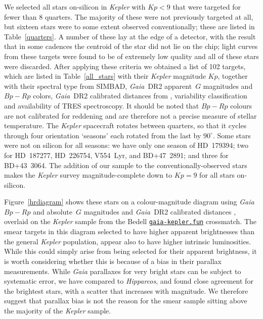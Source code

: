 \documentclass[modern]{aastex62}
\newcommand{\kepler}{\textit{Kepler}\xspace}
\newcommand{\hipparcos}{\textit{Hipparcos}\xspace}
\newcommand{\gaia}{\textit{Gaia}\xspace}
\begin{document}
We selected all stars on-silicon in \kepler with $Kp<9$ that were targeted for fewer than $8$ quarters. The majority of these were not previously targeted at all, but sixteen stars were to some extent observed conventionally; these are listed in Table~\ref{quarters}. A number of these lay at the edge of a detector, with the result that in some cadences the centroid of the star did not lie on the chip; light curves from these targets were found to be of extremely low quality and all of these stars were discarded. After applying these criteria we obtained a list of 102 targets, which are listed in Table~\ref{all_stars} with their \kepler magnitude $Kp$, together with their spectral type from SIMBAD, \gaia~DR2 apparent~$G$ magnitudes and $Bp-Rp$ colors, \gaia~DR2 calibrated distances from \citet{gaiadists}, variability classification and availability of TRES spectroscopy. It should be noted that $Bp-Rp$ colours are not calibrated for reddening and are therefore not a precise measure of stellar temperature. The \kepler spacecraft rotates between quarters, so that it cycles through four orientation `seasons' each rotated from the last by $90^{\circ}$. Some stars were not on silicon for all seasons: we have only one season of HD~179394; two for HD~187277, HD~226754, V554~Lyr, and BD+47~2891; and three for BD+43~3064. The addition of our sample to the conventionally-observed stars makes the \kepler survey magnitude-complete down to $Kp=9$ for all stars on-silicon.

% 



Figure~\ref{hrdiagram} shows these stars on a colour-magnitude diagram using \gaia $Bp-Rp$ and absolute~$G$ magnitudes and \gaia~DR2 calibrated distances \citep{gaiadists}, overlaid on the \kepler sample from the Bedell \href{https://gaia-kepler.fun}{\nolinkurl{gaia-kepler.fun}} crossmatch. The smear targets in this diagram selected to have higher apparent brightnesses than the general \kepler population, appear also to have higher intrinsic luminosities. While this could simply arise from being selected for their apparent brightness, it is {}worth considering whether this is because of a bias in their parallax measurements. While \gaia parallaxes for very bright stars can be subject to systematic error, we have compared to \hipparcos \citep{vanleeuwen07b}, and found close agreement for the brightest stars, with a scatter that increases with magnitude. We therefore suggest that parallax bias is not the reason for the smear sample sitting above the majority of the \kepler sample.
\end{document}
